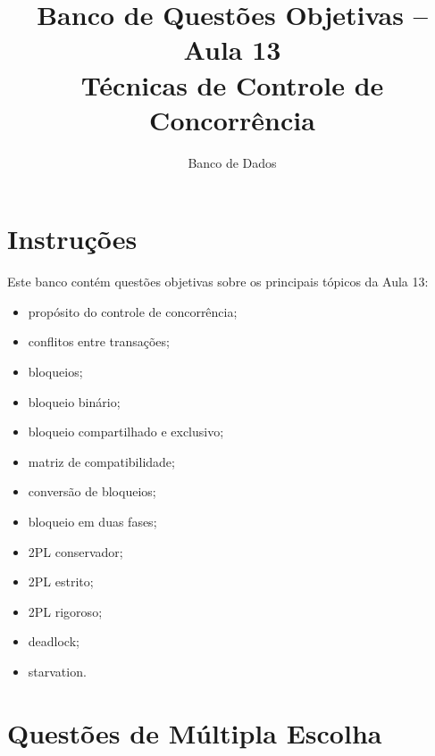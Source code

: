 \documentclass[12pt,a4paper]{article}
\title{Banco de Questões Objetivas -- Aula 13\\Técnicas de Controle de Concorrência}
\author{Banco de Dados}
\date{}
\begin{document}
\maketitle

\section*{Instruções}

Este banco contém questões objetivas sobre os principais tópicos da Aula 13:
\begin{itemize}
    \item propósito do controle de concorrência;
    \item conflitos entre transações;
    \item bloqueios;
    \item bloqueio binário;
    \item bloqueio compartilhado e exclusivo;
    \item matriz de compatibilidade;
    \item conversão de bloqueios;
    \item bloqueio em duas fases;
    \item 2PL conservador;
    \item 2PL estrito;
    \item 2PL rigoroso;
    \item deadlock;
    \item starvation.
\end{itemize}

\section{Questões de Múltipla Escolha}
\end{document}
